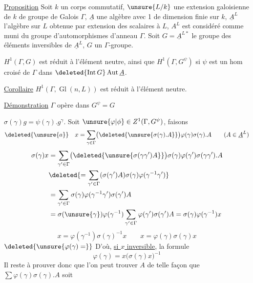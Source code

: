 \uline{Proposition} Soit $k$ un corps commutatif, $\unsure{L/k}$ une extension galoisienne de $k$ de groupe de Galois $\Gamma$, $\underline A$ une algèbre avec 1 de dimension finie sur $k$, $\underline A^L$ l'algèbre sur $L$ obtenue par extension des scalaires à $L$, $A^L$ est considéré comme muni du groupe d'automorphismes d'anneau $\Gamma$. Soit $G=\underline A^{L*}$ le groupe des éléments inversibles de $\underline A^L$, $G$  un $\Gamma$-groupe.

$H^1(\Gamma,G)$ est réduit à l'élément neutre, ainsi que $H^1(\Gamma,G^\psi)$ si $\psi$ est un hom croisé de $\Gamma$ dans $\deleted{\operatorname{Int}G}\operatorname{Aut}\underline A$.

\uline{Corollaire} $H^1(\Gamma,\operatorname{Gl}(n,L))$ est réduit à l'élément neutre.

\uline{Démonstration} $\Gamma$ opère dans $G^\psi=G$

$\sigma(\gamma)g=\psi(\gamma).g^\gamma$. Soit $\unsure{\varphi|\phi}\in Z^1(\Gamma,G^\psi)$,  faisons
\[
\deleted{\unsure{a}}\quad x=\sum_{\gamma\in\Gamma}\bigl(\deleted{\unsure{\sigma(\gamma).A}}\bigr)\varphi(\gamma)\sigma(\gamma).A\qquad(A\in\underline A^L)
\]
\deleted{\unsure{$\exists$}}
\[
\begin{aligned}
\sigma(\gamma)x&=\sum_{\gamma'\in\Gamma}\bigl(\deleted{\unsure{\sigma(\gamma\gamma')A}}\bigr)\sigma(\gamma)\varphi(\gamma')\sigma(\gamma\gamma').A\\
&\deleted{=\sum_{\gamma'\in\Gamma}(\sigma(\gamma')A)\sigma(\gamma)\varphi(\gamma^{-1}\gamma')}\\
&=\sum_{\gamma'\in\Gamma}\sigma(\gamma)\varphi(\gamma^{-1}\gamma')\sigma(\gamma')A\\
&=\sigma(\unsure{\gamma})\varphi(\gamma^{-1})\sum_{\gamma'\in\Gamma}\varphi(\gamma')\sigma(\gamma')A=\sigma(\gamma)\varphi(\gamma^{-1})x
\end{aligned}
\]
\[
x=\varphi(\gamma^{-1})\sigma(\gamma)^{-1}x\qquad x=\varphi(\gamma)\sigma(\gamma)x
\]
$\deleted{\unsure{\varphi(\gamma)=}}$ D'où, \uline{si $x$ inversible}, la formule
\[
\varphi(\gamma)=x\bigl(\sigma(\gamma)x\bigr)^{-1}
\]
Il reste à prouver donc que l'on peut trouver $A$ de telle façon que $\sum\varphi(\gamma)\sigma(\gamma).A$ soit
